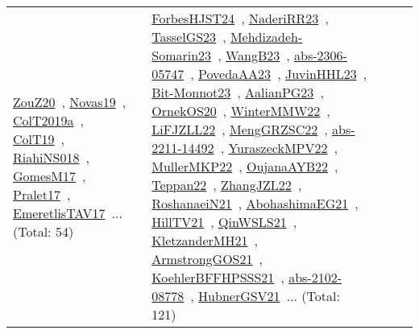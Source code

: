 {\begin{longtable}{lp{3cm}>{\raggedright\arraybackslash}p{6cm}>{\raggedright\arraybackslash}p{6cm}>{\raggedright\arraybackslash}p{8cm}}
\href{../works/ZouZ20.pdf}{ZouZ20}~\cite{ZouZ20}, \href{../works/Novas19.pdf}{Novas19}~\cite{Novas19}, \href{../works/ColT2019a.pdf}{ColT2019a}~\cite{ColT2019a}, \href{../works/ColT19.pdf}{ColT19}~\cite{ColT19}, \href{../works/RiahiNS018.pdf}{RiahiNS018}~\cite{RiahiNS018}, \href{../works/GomesM17.pdf}{GomesM17}~\cite{GomesM17}, \href{../works/Pralet17.pdf}{Pralet17}~\cite{Pralet17}, \href{../works/EmeretlisTAV17.pdf}{EmeretlisTAV17}~\cite{EmeretlisTAV17}... (Total: 54) & \href{../works/ForbesHJST24.pdf}{ForbesHJST24}~\cite{ForbesHJST24}, \href{../works/NaderiRR23.pdf}{NaderiRR23}~\cite{NaderiRR23}, \href{../works/TasselGS23.pdf}{TasselGS23}~\cite{TasselGS23}, \href{../works/Mehdizadeh-Somarin23.pdf}{Mehdizadeh-Somarin23}~\cite{Mehdizadeh-Somarin23}, \href{../works/WangB23.pdf}{WangB23}~\cite{WangB23}, \href{../works/abs-2306-05747.pdf}{abs-2306-05747}~\cite{abs-2306-05747}, \href{../works/PovedaAA23.pdf}{PovedaAA23}~\cite{PovedaAA23}, \href{../works/JuvinHHL23.pdf}{JuvinHHL23}~\cite{JuvinHHL23}, \href{../works/Bit-Monnot23.pdf}{Bit-Monnot23}~\cite{Bit-Monnot23}, \href{../works/AalianPG23.pdf}{AalianPG23}~\cite{AalianPG23}, \href{../works/OrnekOS20.pdf}{OrnekOS20}~\cite{OrnekOS20}, \href{../works/WinterMMW22.pdf}{WinterMMW22}~\cite{WinterMMW22}, \href{../works/LiFJZLL22.pdf}{LiFJZLL22}~\cite{LiFJZLL22}, \href{../works/MengGRZSC22.pdf}{MengGRZSC22}~\cite{MengGRZSC22}, \href{../works/abs-2211-14492.pdf}{abs-2211-14492}~\cite{abs-2211-14492}, \href{../works/YuraszeckMPV22.pdf}{YuraszeckMPV22}~\cite{YuraszeckMPV22}, \href{../works/MullerMKP22.pdf}{MullerMKP22}~\cite{MullerMKP22}, \href{../works/OujanaAYB22.pdf}{OujanaAYB22}~\cite{OujanaAYB22}, \href{../works/Teppan22.pdf}{Teppan22}~\cite{Teppan22}, \href{../works/ZhangJZL22.pdf}{ZhangJZL22}~\cite{ZhangJZL22}, \href{../works/RoshanaeiN21.pdf}{RoshanaeiN21}~\cite{RoshanaeiN21}, \href{../works/AbohashimaEG21.pdf}{AbohashimaEG21}~\cite{AbohashimaEG21}, \href{../works/HillTV21.pdf}{HillTV21}~\cite{HillTV21}, \href{../works/QinWSLS21.pdf}{QinWSLS21}~\cite{QinWSLS21}, \href{../works/KletzanderMH21.pdf}{KletzanderMH21}~\cite{KletzanderMH21}, \href{../works/ArmstrongGOS21.pdf}{ArmstrongGOS21}~\cite{ArmstrongGOS21}, \href{../works/KoehlerBFFHPSSS21.pdf}{KoehlerBFFHPSSS21}~\cite{KoehlerBFFHPSSS21}, \href{../works/abs-2102-08778.pdf}{abs-2102-08778}~\cite{abs-2102-08778}, \href{../works/HubnerGSV21.pdf}{HubnerGSV21}~\cite{HubnerGSV21}... (Total: 121)\\

\end{longtable}}

